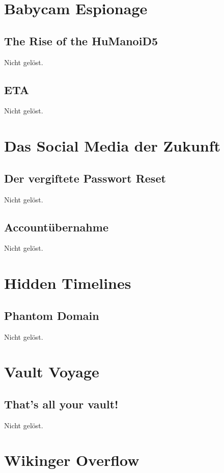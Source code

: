 \documentclass[12pt, a4paper, titlepage, oneside]{scrartcl}
\begin{document}
	\section{Babycam Espionage}

	\subsection{The Rise of the HuManoiD5}
	Nicht gelöst.

	\subsection{ETA}
	Nicht gelöst.

	\section{Das Social Media der Zukunft}

	\subsection{Der vergiftete Passwort Reset}
	Nicht gelöst.

	\subsection{Accountübernahme}
	Nicht gelöst.

	\section{Hidden Timelines}

	\subsection{Phantom Domain}
	Nicht gelöst.

	\section{Vault Voyage}

	\subsection{That's all your vault!}
	Nicht gelöst.

	\section{Wikinger Overflow}
\end{document}
